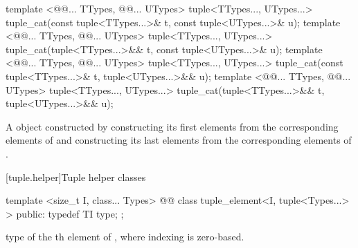 \documentclass[american,twoside]{book}
\begin{document}

\begin{itemdecl}
template <@@... TTypes, @@... UTypes>
  tuple<TTypes..., UTypes...> tuple_cat(const tuple<TTypes...>& t, const tuple<UTypes...>& u);
template <@@... TTypes, @@... UTypes>
  tuple<TTypes..., UTypes...> tuple_cat(tuple<TTypes...>&& t, const tuple<UTypes...>& u);
template <@@... TTypes, @@... UTypes>
  tuple<TTypes..., UTypes...> tuple_cat(const tuple<TTypes...>& t, tuple<UTypes...>&& u);
template <@@... TTypes, @@... UTypes>
  tuple<TTypes..., UTypes...> tuple_cat(tuple<TTypes...>&& t, tuple<UTypes...>&& u);
\end{itemdecl}

\begin{itemdescr}
\pnum
{}

\pnum
\returns A  object constructed by
constructing its first  elements from
the corresponding elements of  and constructing its
last  elements from the corresponding
elements of .
\end{itemdescr}

[tuple.helper]{Tuple helper classes}
\setcounter{Paras}{3}
%
\begin{itemdecl}
template <size_t I, class... Types>
@@
class tuple_element<I, tuple<Types...> > {
public:
  typedef TI type;
};
\end{itemdecl}

\begin{itemdescr}
\pnum
{}

\pnum
{}
type of the th element of ,
where indexing is zero-based.
\end{itemdescr}
\end{document}
